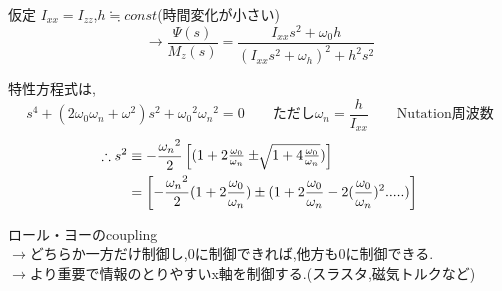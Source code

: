 \documentclass[class=article, crop=false, dvipdfmx]{standalone}
\begin{document}
仮定 $I_{xx} = I_{zz}$,$h \fallingdotseq const$(時間変化が小さい)
\begin{equation}
\rightarrow \frac{\Psi(s)}{M_z(s)} = 
\frac{I_{xx}s^2 + \omega_0 h}{(I_{xx}s^2 + \omega_h)^2 + h^2 s^2}
\end{equation}

特性方程式は,
\begin{equation}
s^4+(2\omega_0 \omega_n+\omega^2)s^2+{\omega_0}^2{\omega_n}^2=0\qquad
\text{ただし}\omega_n=\frac{h}{I_{xx}}\qquad\mathrm{Nutation 周波数}
\end{equation}
\begin{align}
\therefore s^2&\equiv
-\frac{{\omega_n}^2}{2}
\begin{bmatrix}
(1+2\frac{\omega_0}{\omega_n}\pm\sqrt[]{1+4\frac{\omega_0}{\omega_n}})
\end{bmatrix}
\\
&=\qty[
-\frac{{\omega_n}^2}{2}
(1+2\frac{\omega_0}{\omega_n})\pm
(1+2\frac{\omega_0}{\omega_n}-2(\frac{\omega_0}{\omega_n})^2.....)
]
\end{align}


ロール・ヨーのcoupling\\
$\rightarrow$どちらか一方だけ制御し,0に制御できれば,他方も0に制御できる.\\
$\rightarrow$より重要で情報のとりやすいx軸を制御する.(スラスタ,磁気トルクなど)
\end{document}
